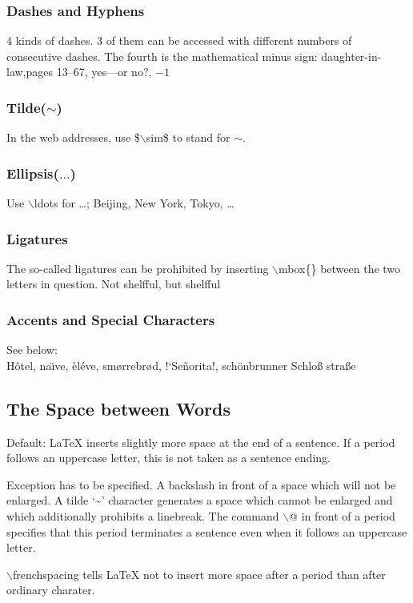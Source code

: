 \documentclass[11pt,a4paper]{article}
\begin{document}
\subsubsection{Dashes and Hyphens}
4 kinds of dashes. 3 of them can be accessed with different numbers of consecutive 
dashes. The fourth is the mathematical minus sign: daughter-in-law,pages 13--67,
yes---or no?, $-1$
\subsubsection{Tilde($\sim$)}
In the web addresses, use \$$\backslash$sim\$ to stand for $\sim$.
\subsubsection{Ellipsis($\ldots$)}
Use $\backslash$ldots for \ldots; Beijing, New York, Tokyo, \ldots
\subsubsection{Ligatures}
The so-called ligatures can be prohibited by inserting $\backslash$mbox\{\} between 
the two letters in question. Not shelfful, but shelf\mbox{}ful
\subsubsection{Accents and Special Characters}
See below:\\
H\^otel, na\"\i ve, \` el\'eve,
sm\o rrebr\o d, !`Se\~norita!,
sch\"onbrunner Schlo\ss{} stra\ss e
\subsection{The Space between Words}
Default: \LaTeX{} inserts slightly more space at the end of a sentence. If a period 
follows an uppercase letter, this is not taken as a sentence ending.

Exception has to be specified. A backslash in front of a space which will not be 
enlarged. A tilde `\~{}' character generates a space which cannot be enlarged and 
which additionally prohibits a linebreak. The command $\backslash$@ in front of a 
period specifies that this period terminates a sentence even when it follows an 
uppercase letter.

$\backslash$frenchspacing tells \LaTeX{} not to insert more space after a period than
after ordinary charater.
\end{document}
